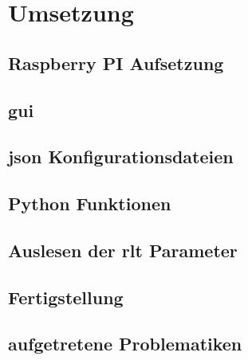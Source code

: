 \chapter{Umsetzung} 

\section{Raspberry PI Aufsetzung}
\setAuthor{\pezze}


\section{\acf{gui}}\label{gui_design}
\setAuthor{\pezze}



\section{\acs{json} Konfigurationsdateien}
\setAuthor{\pezze}



\setAuthor{\schneider}


\section{Python Funktionen}
\setAuthor{\pezze}


\section{Auslesen der \acs{rlt} Parameter}
\setAuthor{\schneider}


\section{Fertigstellung}
\setAuthor{\schneider}


\setAuthor{\pezze}



\newpage
\section{aufgetretene Problematiken}
\setAuthor{\mangeng}

